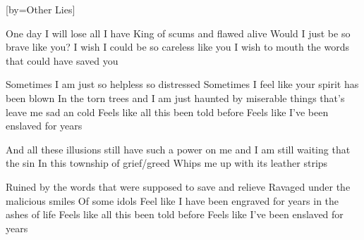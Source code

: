 [by={Other Lies}]

  \chordsoff
  \beginverse
  One day I will lose all I have
  King of scums and flawed alive
  Would I just be so brave like you?
  I wish I could be so careless like you
  I wish to mouth the words that could have saved you  
  \endverse

  \beginverse
  Sometimes I am just so helpless so distressed
  Sometimes I feel like your spirit has been blown 
  In the torn trees
  and I am just haunted by miserable things that’s leave me sad an cold
  Feels like all this been told before
  Feels like I’ve been enslaved for years 
  \endverse
  
  \beginchorus
  And all these illusions still have such a power on me 
  and I am still waiting that the sin
  In this township of grief/greed
  Whips me up with its leather strips
  \endchorus
  
  \beginverse
  Ruined by the words that were supposed to save and relieve
  Ravaged under the malicious smiles
  Of some idols
  Feel like I have been engraved for years in the ashes of life
  Feels like all this been told before 
  Feels like I’ve been enslaved for years 
  \endverse
\endsong
